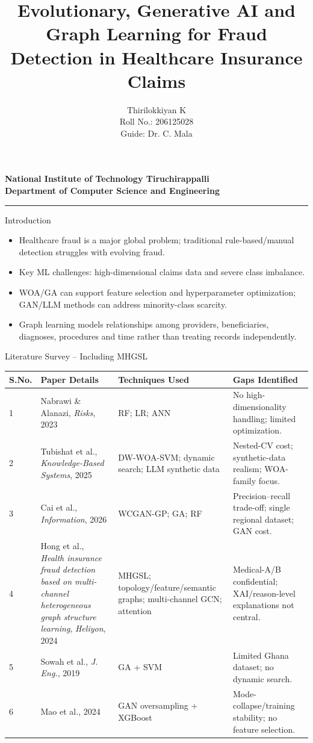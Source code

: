 \documentclass[aspectratio=169,11pt]{beamer}
\title{Evolutionary, Generative AI and Graph Learning for Fraud Detection in Healthcare Insurance Claims}
\author{Thirilokkiyan K\\Roll No.: 206125028\\Guide: Dr. C. Mala}
\date{}
\newcommand{\NITHeader}{\begin{center}{\large\bfseries National Institute of Technology Tiruchirappalli}\\[-1mm]{\normalsize\bfseries Department of Computer Science and Engineering}\end{center}\vspace{-2mm}\hrule\vspace{3mm}}
\begin{document}
\begin{frame}\NITHeader\titlepage\end{frame}

\begin{frame}{Introduction}
\begin{itemize}
\item Healthcare fraud is a major global problem; traditional rule-based/manual detection struggles with evolving fraud.
\item Key ML challenges: high-dimensional claims data and severe class imbalance.
\item WOA/GA can support feature selection and hyperparameter optimization; GAN/LLM methods can address minority-class scarcity.
\item Graph learning models relationships among providers, beneficiaries, diagnoses, procedures and time rather than treating records independently.
\end{itemize}\end{frame}

\begin{frame}{Literature Survey -- Including MHGSL}\scriptsize
\begin{tabular}{p{}p{}p{}p{}}\toprule
\textbf{S.No.}&\textbf{Paper Details}&\textbf{Techniques Used}&\textbf{Gaps Identified}\\\midrule
1&Nabrawi \& Alanazi, \emph{Risks}, 2023&RF; LR; ANN&No high-dimensionality handling; limited optimization.\\
2&Tubishat et al., \emph{Knowledge-Based Systems}, 2025&DW-WOA-SVM; dynamic search; LLM synthetic data&Nested-CV cost; synthetic-data realism; WOA-family focus.\\
3&Cai et al., \emph{Information}, 2026&WCGAN-GP; GA; RF&Precision--recall trade-off; single regional dataset; GAN cost.\\
4&Hong et al., \emph{Health insurance fraud detection based on multi-channel heterogeneous graph structure learning}, \emph{Heliyon}, 2024&MHGSL; topology/feature/semantic graphs; multi-channel GCN; attention&Medical-A/B confidential; XAI/reason-level explanations not central.\\
5&Sowah et al., \emph{J. Eng.}, 2019&GA + SVM&Limited Ghana dataset; no dynamic search.\\
6&Mao et al., 2024&GAN oversampling + XGBoost&Mode-collapse/training stability; no feature selection.\\
\bottomrule\end{tabular}\end{frame}
\end{document}
